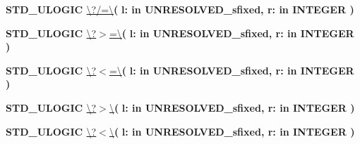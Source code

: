 \begin{DoxyCompactItemize}
\item 
{\bfseries {\bfseries \textcolor{comment}{S\+T\+D\+\_\+\+U\+L\+O\+G\+I\+C}\textcolor{vhdlchar}{ }}} \hyperlink{classfixed__pkg_a172a73302b09f0d298b93ecda8c5e976}{\textbackslash{}?/=\textbackslash{}}{\bfseries  ( }{\bfseries \textcolor{vhdlchar}{l\+: }\textcolor{stringliteral}{in }\textcolor{vhdlchar}{U\+N\+R\+E\+S\+O\+L\+V\+E\+D\+\_\+sfixed}}{\bfseries  , \textcolor{vhdlchar}{r\+: }\textcolor{stringliteral}{in }{\bfseries \textcolor{comment}{I\+N\+T\+E\+G\+E\+R}\textcolor{vhdlchar}{ }}}{\bfseries  )} 
\item 
{\bfseries {\bfseries \textcolor{comment}{S\+T\+D\+\_\+\+U\+L\+O\+G\+I\+C}\textcolor{vhdlchar}{ }}} \hyperlink{classfixed__pkg_a3adee8c12e5c0bb76fc3e1a493284a27}{\textbackslash{}?$>$=\textbackslash{}}{\bfseries  ( }{\bfseries \textcolor{vhdlchar}{l\+: }\textcolor{stringliteral}{in }\textcolor{vhdlchar}{U\+N\+R\+E\+S\+O\+L\+V\+E\+D\+\_\+sfixed}}{\bfseries  , \textcolor{vhdlchar}{r\+: }\textcolor{stringliteral}{in }{\bfseries \textcolor{comment}{I\+N\+T\+E\+G\+E\+R}\textcolor{vhdlchar}{ }}}{\bfseries  )} 
\item 
{\bfseries {\bfseries \textcolor{comment}{S\+T\+D\+\_\+\+U\+L\+O\+G\+I\+C}\textcolor{vhdlchar}{ }}} \hyperlink{classfixed__pkg_a271da29f659a2bc9480dbd29d7727913}{\textbackslash{}?$<$=\textbackslash{}}{\bfseries  ( }{\bfseries \textcolor{vhdlchar}{l\+: }\textcolor{stringliteral}{in }\textcolor{vhdlchar}{U\+N\+R\+E\+S\+O\+L\+V\+E\+D\+\_\+sfixed}}{\bfseries  , \textcolor{vhdlchar}{r\+: }\textcolor{stringliteral}{in }{\bfseries \textcolor{comment}{I\+N\+T\+E\+G\+E\+R}\textcolor{vhdlchar}{ }}}{\bfseries  )} 
\item 
{\bfseries {\bfseries \textcolor{comment}{S\+T\+D\+\_\+\+U\+L\+O\+G\+I\+C}\textcolor{vhdlchar}{ }}} \hyperlink{classfixed__pkg_a9e6b6b8c2c14da978e6f70cb6e85e6dc}{\textbackslash{}?$>$\textbackslash{}}{\bfseries  ( }{\bfseries \textcolor{vhdlchar}{l\+: }\textcolor{stringliteral}{in }\textcolor{vhdlchar}{U\+N\+R\+E\+S\+O\+L\+V\+E\+D\+\_\+sfixed}}{\bfseries  , \textcolor{vhdlchar}{r\+: }\textcolor{stringliteral}{in }{\bfseries \textcolor{comment}{I\+N\+T\+E\+G\+E\+R}\textcolor{vhdlchar}{ }}}{\bfseries  )} 
\item 
{\bfseries {\bfseries \textcolor{comment}{S\+T\+D\+\_\+\+U\+L\+O\+G\+I\+C}\textcolor{vhdlchar}{ }}} \hyperlink{classfixed__pkg_a7e98e66a4a282c529968f69f70dd16ad}{\textbackslash{}?$<$\textbackslash{}}{\bfseries  ( }{\bfseries \textcolor{vhdlchar}{l\+: }\textcolor{stringliteral}{in }\textcolor{vhdlchar}{U\+N\+R\+E\+S\+O\+L\+V\+E\+D\+\_\+sfixed}}{\bfseries  , \textcolor{vhdlchar}{r\+: }\textcolor{stringliteral}{in }{\bfseries \textcolor{comment}{I\+N\+T\+E\+G\+E\+R}\textcolor{vhdlchar}{ }}}{\bfseries  )} 

\end{DoxyCompactItemize}
